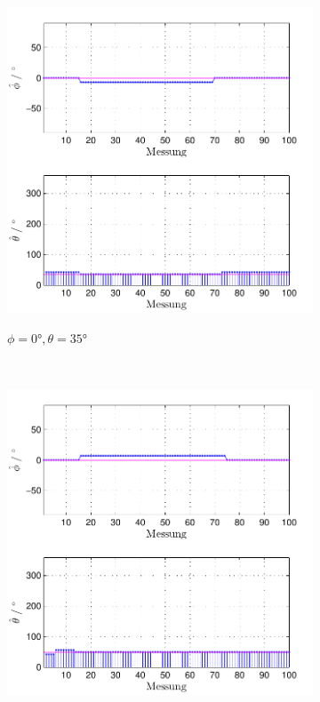 \begin{figure}
\begin{subfigure}[b]{0.48\textwidth}
                \includegraphics[width=\textwidth]{grafiken/04_Echtzeitversuch/MALE_Phi_0_Theta_35}
                \label{fig:Foto_DSP_Draufsicht}
                \caption{$\phi=0°, \theta = 35°$}
        \end{subfigure}
        ~ %
        \begin{subfigure}[b]{0.48\textwidth}
                \centering
                \includegraphics[width=\textwidth]{grafiken/04_Echtzeitversuch/MALE_Phi_0_Theta_49}

\end{subfigure}
\end{figure}
